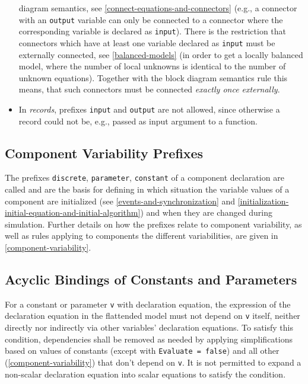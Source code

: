 \begin{itemize}
  diagram semantics, see \cref{connect-equations-and-connectors} (e.g., a connector with an \lstinline!output!
  variable can only be connected to a connector where the corresponding
  variable is declared as \lstinline!input!). There is the restriction that
  connectors which have at least one variable declared as \lstinline!input! must be
  externally connected, see \cref{balanced-models} (in order to get a locally
  balanced model, where the number of local unknowns is identical to the
  number of unknown equations). Together with the block diagram
  semantics rule this means, that such connectors must be connected
  \emph{exactly once externally}.
\item
  In \emph{records}, prefixes \lstinline!input! and \lstinline!output! are not allowed, since
  otherwise a record could not be, e.g., passed as input argument to a
  function.
\end{itemize}


\subsection{Component Variability Prefixes}\label{component-variability-prefixes-discrete-parameter-constant}

The prefixes \lstinline!discrete!, \lstinline!parameter!, \lstinline!constant! of a component declaration are called  and are the basis for defining in which situation the variable values of a component are initialized (see \cref{events-and-synchronization} and \cref{initialization-initial-equation-and-initial-algorithm}) and when they are changed during simulation.
Further details on how the prefixes relate to component variability, as well as rules applying to components the different variabilities, are given in \cref{component-variability}.


\subsection{Acyclic Bindings of Constants and Parameters}\label{acyclic-bindings-of-constants-and-parameters}

For a constant or parameter \lstinline!v! with declaration equation, the expression of the declaration equation in the flattended model must not depend on \lstinline!v! itself, neither directly nor indirectly via other variables' declaration equations.
To satisfy this condition, dependencies shall be removed as needed by applying simplifications based on values of constants (except with \lstinline!Evaluate = false!) and all other  (\cref{component-variability}) that don't depend on \lstinline!v!.
It is not permitted to expand a non-scalar declaration equation into scalar equations to satisfy the condition.

